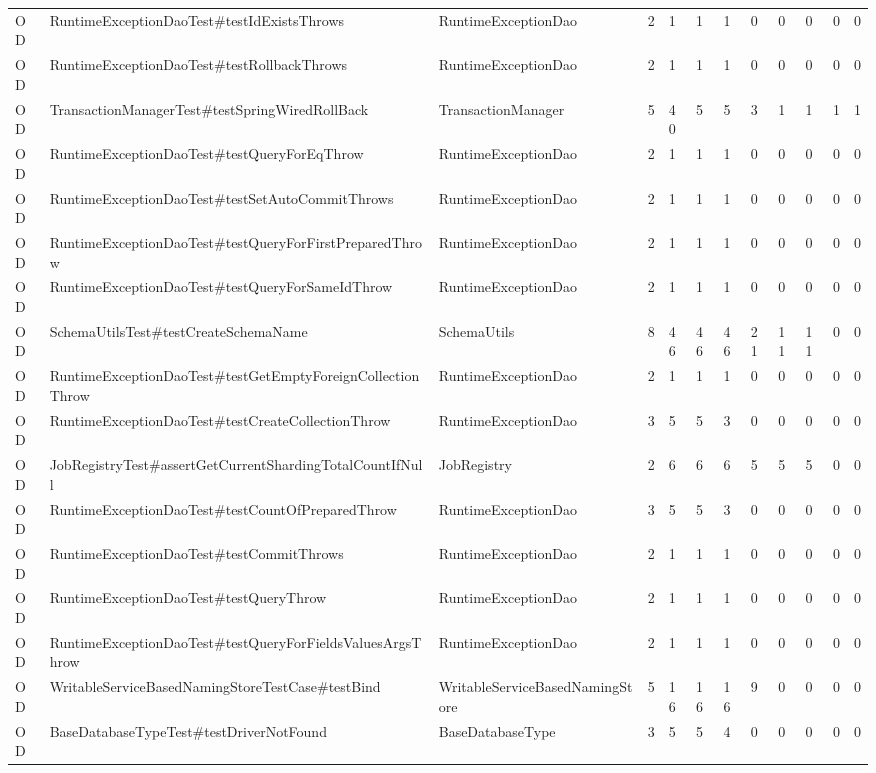 \begin{table}[t]
\begin{tabular}{llllllllllll}
OD & RuntimeExceptionDaoTest\#testIdExistsThrows & RuntimeExceptionDao & 2 & 1 & 1 & 1 & 0 & 0 & 0 & 0 & 0 \\
OD & RuntimeExceptionDaoTest\#testRollbackThrows & RuntimeExceptionDao & 2 & 1 & 1 & 1 & 0 & 0 & 0 & 0 & 0 \\
OD & TransactionManagerTest\#testSpringWiredRollBack & TransactionManager & 5 & 40 & 5 & 5 & 3 & 1 & 1 & 1 & 1 \\
OD & RuntimeExceptionDaoTest\#testQueryForEqThrow & RuntimeExceptionDao & 2 & 1 & 1 & 1 & 0 & 0 & 0 & 0 & 0 \\
OD & RuntimeExceptionDaoTest\#testSetAutoCommitThrows & RuntimeExceptionDao & 2 & 1 & 1 & 1 & 0 & 0 & 0 & 0 & 0 \\
OD & RuntimeExceptionDaoTest\#testQueryForFirstPreparedThrow & RuntimeExceptionDao & 2 & 1 & 1 & 1 & 0 & 0 & 0 & 0 & 0 \\
OD & RuntimeExceptionDaoTest\#testQueryForSameIdThrow & RuntimeExceptionDao & 2 & 1 & 1 & 1 & 0 & 0 & 0 & 0 & 0 \\
OD & SchemaUtilsTest\#testCreateSchemaName & SchemaUtils & 8 & 46 & 46 & 46 & 21 & 11 & 11 & 0 & 0 \\
OD & RuntimeExceptionDaoTest\#testGetEmptyForeignCollectionThrow & RuntimeExceptionDao & 2 & 1 & 1 & 1 & 0 & 0 & 0 & 0 & 0 \\
OD & RuntimeExceptionDaoTest\#testCreateCollectionThrow & RuntimeExceptionDao & 3 & 5 & 5 & 3 & 0 & 0 & 0 & 0 & 0 \\
OD & JobRegistryTest\#assertGetCurrentShardingTotalCountIfNull & JobRegistry & 2 & 6 & 6 & 6 & 5 & 5 & 5 & 0 & 0 \\
OD & RuntimeExceptionDaoTest\#testCountOfPreparedThrow & RuntimeExceptionDao & 3 & 5 & 5 & 3 & 0 & 0 & 0 & 0 & 0 \\
OD & RuntimeExceptionDaoTest\#testCommitThrows & RuntimeExceptionDao & 2 & 1 & 1 & 1 & 0 & 0 & 0 & 0 & 0 \\
OD & RuntimeExceptionDaoTest\#testQueryThrow & RuntimeExceptionDao & 2 & 1 & 1 & 1 & 0 & 0 & 0 & 0 & 0 \\
OD & RuntimeExceptionDaoTest\#testQueryForFieldsValuesArgsThrow & RuntimeExceptionDao & 2 & 1 & 1 & 1 & 0 & 0 & 0 & 0 & 0 \\
OD & WritableServiceBasedNamingStoreTestCase\#testBind & WritableServiceBasedNamingStore & 5 & 16 & 16 & 16 & 9 & 0 & 0 & 0 & 0 \\
OD & BaseDatabaseTypeTest\#testDriverNotFound & BaseDatabaseType & 3 & 5 & 5 & 4 & 0 & 0 & 0 & 0 & 0 \\

\end{tabular}
\end{table}
